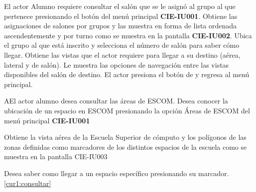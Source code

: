  \begin{UCtrayectoria}
    \UCpaso[\UCactor] El actor Alumno requiere consultar el salón que se le asignó al grupo al que pertenece presionando el botón  del menú principal \textbf{CIE-IU001}.  
    \UCpaso[\UCsist] Obtiene las asignaciones de salones por grupos y las muestra en forma de lista ordenada ascendentemente y por turno como se muestra en la pantalla \textbf{CIE-IU002}. 
    \UCpaso[\UCactor] Ubica el grupo al que está inscrito y selecciona el número de salón para saber cómo llegar.
    \UCpaso[\UCsist] Obtiene las vistas que el actor requiere para llegar a su destino (aérea, lateral y de salón). \label{cur1:consultar}
    \UCpaso[\UCsist] Le muestra las opciones de navegación entre las vistas disponibles del salón de destino.
	\UCpaso[\UCactor] El actor presiona el botón de  y regresa al menú principal.
 \end{UCtrayectoria}

 \begin{UCtrayectoriaA}{A}{El actor alumno desea consultar las áreas de ESCOM.}
    \UCpaso[\UCactor] Desea conocer la ubicación de un espacio en ESCOM presionando la opción Áreas de ESCOM del menú principal \textbf{CIE-IU001}
    
   \UCpaso[\UCsist] Obtiene la vista aérea de la Escuela Superior de cómputo y los polígonos de las zonas definidas como marcadores de los distintos espacios de la escuela como se muestra en la pantalla CIE-IU003
   
   \UCpaso[\UCactor] Desea saber como llegar a un espacio específico presionando su marcador. \ref{cur1:consultar}
 \end{UCtrayectoriaA}
 

 
%
%
 
